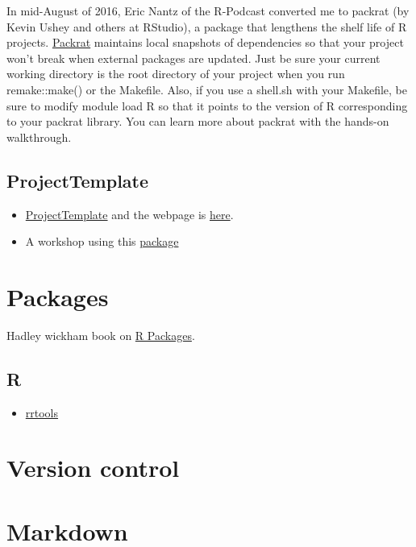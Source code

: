 \documentclass[
]{book}
\providecommand{\tightlist}{%
  \setlength{\itemsep}{0pt}\setlength{\parskip}{0pt}}
\theoremstyle{definition}
\theoremstyle{definition}
\theoremstyle{definition}
\theoremstyle{definition}
\theoremstyle{remark}
\begin{document}
In mid-August of 2016, Eric Nantz of the R-Podcast converted me to packrat (by Kevin Ushey and others at RStudio), a package that lengthens the shelf life of R projects. \href{https://rstudio.github.io/packrat/}{Packrat} maintains local snapshots of dependencies so that your project won't break when external packages are updated. Just be sure your current working directory is the root directory of your project when you run remake::make() or the Makefile. Also, if you use a shell.sh with your Makefile, be sure to modify module load R so that it points to the version of R corresponding to your packrat library. You can learn more about packrat with the hands-on walkthrough.

\hypertarget{projecttemplate}{%
\subsection{ProjectTemplate}\label{projecttemplate}}

\begin{itemize}
\tightlist
\item
  \href{https://cran.r-project.org/web/packages/ProjectTemplate/ProjectTemplate.pdf}{ProjectTemplate} and the webpage is \href{http://projecttemplate.net/}{here}.
\item
  A workshop using this \href{https://github.com/jeromyanglim/leuven2016rworkshop}{package}
\end{itemize}

\hypertarget{packages}{%
\section{Packages}\label{packages}}

Hadley wickham book on \href{http://r-pkgs.had.co.nz/}{R Packages}.

\hypertarget{r}{%
\subsection{R}\label{r}}

\begin{itemize}
\tightlist
\item
  \href{https://github.com/benmarwick/rrtools}{rrtools}
\end{itemize}

\hypertarget{version-control}{%
\section{Version control}\label{version-control}}

\hypertarget{markdown}{%
\section{Markdown}\label{markdown}}

  
\end{document}
